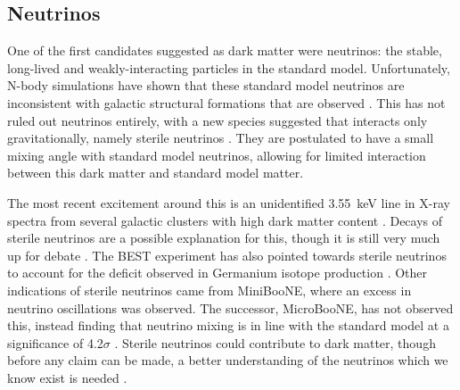 \subsection{Neutrinos}
\par
One of the first candidates suggested as dark matter were neutrinos: the stable, long-lived and weakly-interacting particles in the standard model.
Unfortunately, N-body simulations have shown that these standard model neutrinos are inconsistent with galactic structural formations that are observed \cite{neutrinos_and_galaxy_clustering_ref}. 
This has not ruled out neutrinos entirely, with a new species suggested that interacts only gravitationally, namely sterile neutrinos \cite{sterile_neutrinos_ref}.
They are postulated to have a small mixing angle with standard model neutrinos, allowing for limited interaction between this dark matter and standard model matter.
\par
The most recent excitement around this is an unidentified 3.55~keV line in X-ray spectra from several galactic clusters with high dark matter content \cite{sterile_neutrino_xray_decay_ref}.
Decays of sterile neutrinos are a possible explanation for this, though it is still very much up for debate \cite{xray_from_sterile_neutrons_2_ref, xray_from_sterile_neutrons_3_ref}.
The BEST experiment has also pointed towards sterile neutrinos to account for the deficit observed in Germanium isotope production \cite{best_sterile_neutrino_result_ref,best_sterile_neutrino_2_ref}.
Other indications of sterile neutrinos came from MiniBooNE, where an excess in neutrino oscillations was observed.
The successor, MicroBooNE, has not observed this, instead finding that neutrino mixing is in line with the standard model at a significance of 4.2$\sigma$ \cite{miniboone_and_microboone_sterile_neutrino_ref}.
Sterile neutrinos could contribute to dark matter, though before any claim can be made, a better understanding of the neutrinos which we know exist is needed \cite{sterile_neutrino_as_dm_ref, sterile_neutrinos_dm_ref}.

